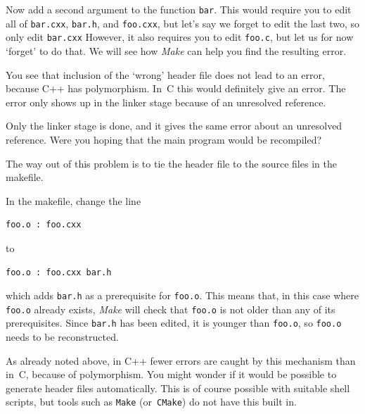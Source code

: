 Now add a second argument to the function \lstinline{bar}.
This would require you to edit all of \lstinline{bar.cxx}, \lstinline{bar.h},
and \lstinline{foo.cxx}, 
but let's say we forget to edit the last two, so only edit \lstinline{bar.cxx}
However, it also requires you to edit \lstinline{foo.c}, but let us for
now `forget' to do that. We will see how \emph{Make} can help you find
the resulting error.

          {You see that inclusion of the `wrong' header file
            does not lead to an error, because C++ has polymorphism.
            In~C this would definitely give an error.
            The error only shows up in the linker stage
            because of an unresolved reference.}{}

    {Only the linker stage is done, and it gives the same error about
      an unresolved reference. Were you hoping that the main program
    would be recompiled?}{}

The way out of this problem is to tie the header file to the source files
in the makefile.

In the makefile, change the line
\begin{lstlisting}
foo.o : foo.cxx
\end{lstlisting}
to
\begin{lstlisting}
foo.o : foo.cxx bar.h
\end{lstlisting}
which adds \lstinline{bar.h} as a prerequisite for \lstinline{foo.o}. This means that,
in this case where \lstinline{foo.o} already exists, \emph{Make} will check
that \lstinline{foo.o} is not older than any of its prerequisites. Since
\lstinline{bar.h} has been edited, it is younger than \lstinline{foo.o}, so \lstinline{foo.o}
needs to be reconstructed.

\begin{remark}
  As already noted above, in C++ fewer errors are caught by this
  mechanism than in~C, because of polymorphism.
  You might wonder if it would be possible to generate header files
  automatically. This is of course possible with suitable shell scripts,
  but tools such as \lstinline{Make} (or~\lstinline{CMake}) do not have this built in.
\end{remark}

  
